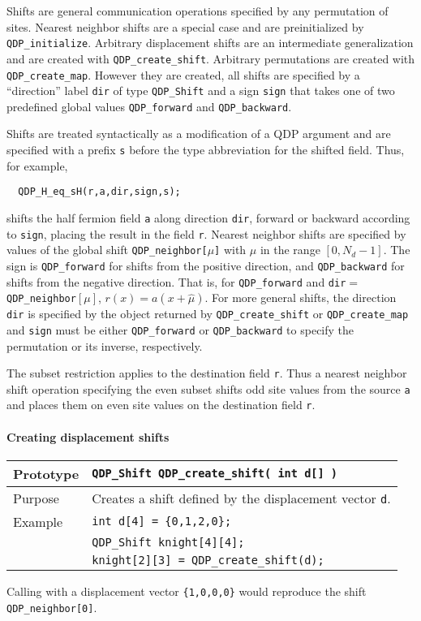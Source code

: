 \documentclass{article}
\begin{document}
Shifts are general communication operations specified by any
permutation of sites.  Nearest neighbor shifts are a special case and
are preinitialized by \verb|QDP_initialize|. Arbitrary displacement
shifts are an intermediate generalization and are created with
\verb|QDP_create_shift|.  Arbitrary permutations are created with
\verb|QDP_create_map|.  However they are created, all shifts are
specified by a ``direction'' label \verb|dir| of type \verb|QDP_Shift|
and a sign \verb|sign| that takes one of two predefined global values
\verb|QDP_forward| and \verb|QDP_backward|.

Shifts are treated syntactically as a modification of a QDP argument
and are specified with a prefix {\tt s} before the type abbreviation
for the shifted field. Thus, for example,
%
\begin{verbatim}
  QDP_H_eq_sH(r,a,dir,sign,s);
\end{verbatim}
%
shifts the half fermion field {\tt a} along direction {\tt dir},
forward or backward according to {\tt sign}, placing the result in the
field {\tt r}.  Nearest neighbor shifts are specified by values of the
global shift \verb|QDP_neighbor[|$\mu$\verb|]| with $\mu$ in the range
$[0,N_d-1]$.  The sign
is \verb|QDP_forward| for shifts from the positive direction, and
\verb|QDP_backward| for shifts from the negative direction.  That is,
for \verb|QDP_forward| and {\tt dir}$=$ \verb|QDP_neighbor|$[\mu]$,
$r(x) = a(x+\hat \mu)$. For more general shifts, the direction {\tt
dir} is specified by the object returned by \verb|QDP_create_shift| or
\verb|QDP_create_map| and {\tt sign} must be either \verb|QDP_forward|
or \verb|QDP_backward| to specify the permutation or its inverse,
respectively.

The subset restriction applies to the destination field {\tt r}.  Thus
a nearest neighbor shift operation specifying the even subset shifts
odd site values from the source {\tt a} and places them on even site
values on the destination field {\tt r}.

\paragraph{Creating displacement shifts}

\begin{flushleft}
\begin{tabular}{|l|l|}
  \hline
  Prototype      & \verb|QDP_Shift QDP_create_shift( int d[] )|\\
\hline
Purpose        & Creates a shift defined by the displacement vector \verb|d|.\\
    \hline
Example  & \verb|int d[4] = {0,1,2,0};|\\
         & \verb|QDP_Shift knight[4][4];|\\
         & \verb|knight[2][3] = QDP_create_shift(d);| \\
\hline
  \end{tabular}
\end{flushleft}
%
Calling with a displacement vector \verb|{1,0,0,0}| would reproduce
the shift \verb|QDP_neighbor[0]|.
\end{document}
